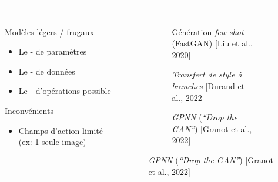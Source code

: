\documentclass[aspectratio=169, 22pt]{beamer}
\begin{document}
\begin{frame}{\secname~- \subsecname}
  \begin{columns}
    \begin{column}{0.5\linewidth}
      \begin{customblock}{Modèles légers / frugaux}        
        \begin{itemize}
        \item \small Le - de paramètres
        \item \small Le - de données
        \item \small Le - d'opérations possible
        \end{itemize}
      \end{customblock}
      \begin{alertblock}{Inconvénients}
        \begin{itemize}
        \item \small Champs d'action limité (ex: 1 seule image)
        \end{itemize}
      \end{alertblock}
    \end{column}
    \begin{column}{0.5\linewidth}
      \begin{figure}
        \begin{subfigure}{0.45\linewidth}
          \caption{Génération \emph{few-shot} (FastGAN) [Liu et al., 2020]}
        \end{subfigure}
        \begin{subfigure}{0.45\linewidth}
          \caption{\emph{Transfert de style à branches} [Durand et al., 2022]}
        \end{subfigure}
        \begin{subfigure}{0.45\linewidth}
          \caption{\emph{GPNN} (\emph{``Drop the GAN''}) [Granot et al., 2022]}
        \end{subfigure}
      \end{figure}
    \end{column}
  \end{columns}  
\end{frame}
\end{document}
